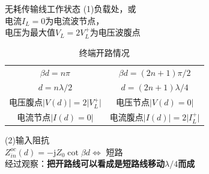 \begin{frame}{无耗传输线工作状态}
 (1)负载处，或\\
 电流$I_{L}=0$为电流波节点，\\
 电压为最大值$V_{L}=2V_{L}^{+}$为电压波腹点
 \begin{table}[h!]
  \begin{center}
   \caption{终端开路情况}
   \begin{tabular}{|c|c|}
    \hline
    $\beta d=n\pi$                                      & $\beta d=(2n+1)\pi/2$                               \\
    $d=n\lambda/2$                                      & $d=(2n+1)\lambda/4$                                 \\
    \hline
    电压腹点$\lvert V(d)\rvert=2\lvert V_{L}^{+}\rvert$ & 电压节点$\lvert V(d)=0\rvert$                       \\
    电流节点$\lvert I(d)=0\rvert$                       & 电流腹点$\lvert I(d)\rvert=2\lvert I_{L}^{+}\rvert$ \\
    \hline
   \end{tabular}
  \end{center}
 \end{table}
 (2)输入阻抗\\
 $Z_{in}^{oc}(d)=-\mathrm{j}Z_{0}\cot\beta d\Longleftrightarrow$ 短路 \\
 经过观察：\textbf{把开路线可以看成是短路线移动$\lambda/4$而成}
\end{frame}


